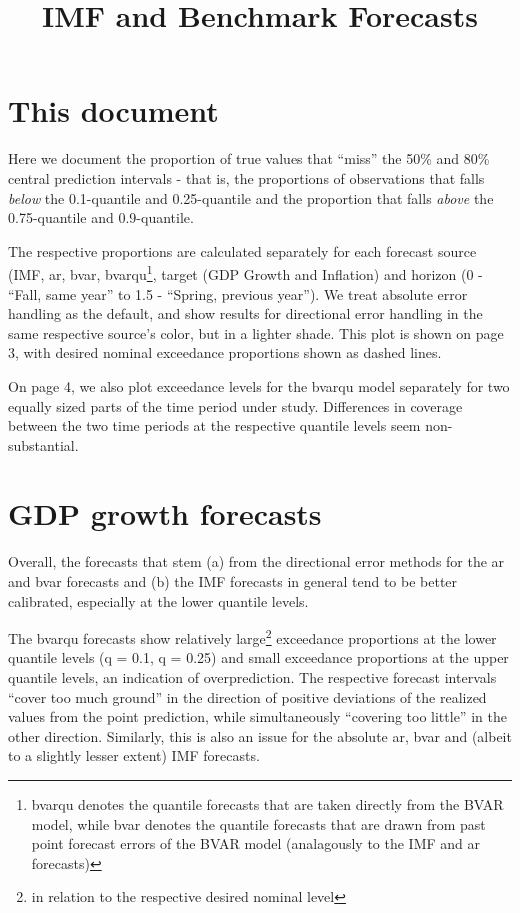\documentclass[
]{article}
\title{IMF and Benchmark Forecasts}
\author{}
\date{\vspace{-2.5em}}
\begin{document}
\maketitle

\hypertarget{this-document}{%
\section{This document}\label{this-document}}

Here we document the proportion of true values that ``miss'' the 50\% and 80\% central prediction intervals - that is, the proportions of observations that falls \textit{below} the 0.1-quantile and 0.25-quantile and the proportion that falls \textit{above} the 0.75-quantile and 0.9-quantile.

The respective proportions are calculated separately for each forecast source (IMF, ar, bvar, bvarqu\footnote{bvarqu denotes the quantile forecasts that are taken directly from the BVAR model, while bvar denotes the quantile forecasts that are drawn from past point forecast errors of the BVAR model (analagously to the IMF and ar forecasts)}, target (GDP Growth and Inflation) and horizon (0 - ``Fall, same year'' to 1.5 - ``Spring, previous year''). We treat absolute error handling as the default, and show results for directional error handling in the same respective source's color, but in a lighter shade. This plot is shown on page 3, with desired nominal exceedance proportions shown as dashed lines.

On page 4, we also plot exceedance levels for the bvarqu model separately for two equally sized parts of the time period under study. Differences in coverage between the two time periods at the respective quantile levels seem non-substantial.

\hypertarget{gdp-growth-forecasts}{%
\section{GDP growth forecasts}\label{gdp-growth-forecasts}}

Overall, the forecasts that stem (a) from the directional error methods for the ar and bvar forecasts and (b) the IMF forecasts in general tend to be better calibrated, especially at the lower quantile levels.

The bvarqu forecasts show relatively large\footnote{in relation to the respective desired nominal level} exceedance proportions at the lower quantile levels (q = 0.1, q = 0.25) and small exceedance proportions at the upper quantile levels, an indication of overprediction. The respective forecast intervals ``cover too much ground'' in the direction of positive deviations of the realized values from the point prediction, while simultaneously ``covering too little'' in the other direction. Similarly, this is also an issue for the absolute ar, bvar and (albeit to a slightly lesser extent) IMF forecasts.
\end{document}

